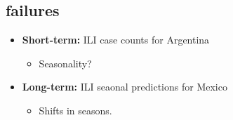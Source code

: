 \subsection{failures}

\begin{itemize}
  \item {\bf Short-term:} ILI case counts for Argentina
    \begin{itemize}
      \item Seasonality?
    \end{itemize}
  \item {\bf Long-term:} ILI seaonal predictions for Mexico
    \begin{itemize}
      \item Shifts in seasons. 
    \end{itemize}
\end{itemize}

